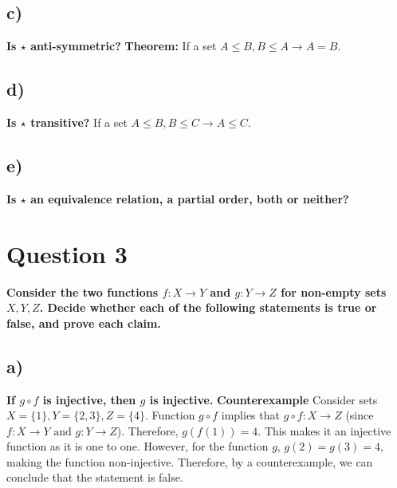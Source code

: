 \documentclass{article}
\begin{document}
\subsection{c)}
\textbf{Is $\star $ anti-symmetric? }
\newline
\newline
\textbf{Theorem: } If a set $A \leq B, B \leq A \rightarrow A = B.$
\newline
{}
\newpage
\subsection{d)}
\textbf{ Is $\star $ transitive?}
\newline
\newline
If a set $A \leq B, B \leq C \rightarrow A \leq C.$
\newline
{}
\newpage
\subsection{e)}
\textbf{ Is $\star $ an equivalence relation, a partial order, both or neither?}
\newline
{}
\newpage
\section{Question 3}
\textbf{ Consider the two functions $f: X \rightarrow Y$ and $g: Y \rightarrow Z$ for non-empty sets $X, Y, Z$.
Decide whether each of the following statements is true or false, and prove each claim.}
\subsection{a)}
\textbf{ If $g \circ f$ is injective, then $g$ is injective.}
\newline
\newline
\textbf{ Counterexample }
\newline
\newline
Consider sets $X = \{1\}, Y = \{2, 3\}, Z = \{4\}.$
\newline
\newline
Function $g \circ f$ implies that $g \circ f: X \rightarrow Z$ (since $f: X \rightarrow Y \text{ and } g: Y \rightarrow Z$). Therefore, $g(f(1)) = 4.$
\newline
This makes it an injective function as it is one to one.
\newline
\newline
However, for the function $g$, $g(2) = g(3) = 4, $ making the function non-injective.
\newline
\newline
Therefore, by a counterexample, we can conclude that the statement is false.
\newpage
\end{document}
